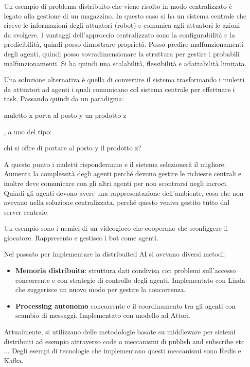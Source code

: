 \begin{esempio}
    Un esempio di problema distribuito che viene risolto in modo centralizzato è
    legato alla gestione di un magazzino. In questo caso si ha un sistema centrale
    che riceve le informazioni degli attuatori (robot) e comunica agli attuatori le
    azioni da svolgere. I vantaggi dell'approccio centralizzato sono la
    configurabilità e la predicibilità, quindi posso dimostrare proprietà. Posso
    predire malfunzionamenti degli agenti, quindi posso sovradimensionare la
    struttura per gestire i probabili malfunzionamenti. Si ha quindi una scalabilità,
    flessibilità e adattabilità limitata.

    Una soluzione alternativa è quella di convertire il sistema trasformando i
    muletti da attuatori ad agenti i quali comunicano col sistema centrale per
    effettuare i task. Passando quindi da un paradigma:
    \begin{center}
        muletto x porta al posto y un prodotto z
    \end{center},
    a uno del tipo:
    \begin{center}
        chi si offre di portare al posto y il prodotto z?
    \end{center}
    A questo punto i muletti risponderanno e il sistema selezionerà il migliore.
    Aumenta la complessità degli agenti perché devono gestire le richieste centrali
    e inoltre deve comunicare con gli altri agenti per non scontrarsi negli
    incroci. Quindi gli agenti devono avere una rappresentazione dell'ambiente,
    cosa che non avevano nella soluzione centralizzata, perché questo veniva
    gestito tutto dal server centrale.
\end{esempio}
\begin{esempio}
    Un esempio sono i nemici di un videogioco che cooperano che sconfiggere il
    giocatore. Rappresento e gestisco i bot come agenti.
\end{esempio}
Nel passato per implementare la distribuited AI si avevano diversi metodi:
\begin{itemize}
    \item \textbf{Memoria distribuita}: struttura dati condivisa con problemi
          sull'accesso concorrente e con strategie di controllo degli agenti.
          Implementato con Linda che suggerisce un nuovo modo per gestire la
          concorrenza.
    \item \textbf{Processing autonomo} concorrente e il coordinamento tra gli
          agenti con scambio di messaggi. Implementato con modello ad Attori.
\end{itemize}
Attualmente, si utilizzano delle metodologie basate su middleware per sistemi
distribuiti ad esempio attraverso code o meccanismi di publish and subscribe
etc$\dots$ Degli esempi di tecnologie che implementano questi meccanismi sono
Redis e Kafka.

